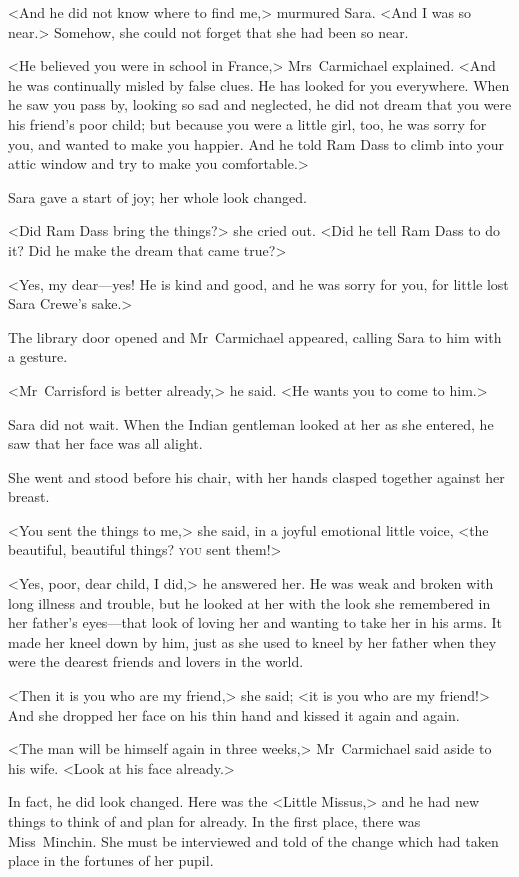 <And he did not know where to find me,> murmured Sara. <And I was so near.> Somehow, she could not forget that she had been so near.

<He believed you were in school in France,> Mrs~Carmichael explained. <And he was continually misled by false clues. He has looked for you everywhere. When he saw you pass by, looking so sad and neglected, he did not dream that you were his friend's poor child; but because you were a little girl, too, he was sorry for you, and wanted to make you happier. And he told Ram Dass to climb into your attic window and try to make you comfortable.>

Sara gave a start of joy; her whole look changed.

<Did Ram Dass bring the things?> she cried out. <Did he tell Ram Dass to do it? Did he make the dream that came true?>

<Yes, my dear—yes! He is kind and good, and he was sorry for you, for little lost Sara Crewe's sake.>

The library door opened and Mr~Carmichael appeared, calling Sara to him with a gesture.

<Mr~Carrisford is better already,> he said. <He wants you to come to him.>

Sara did not wait. When the Indian gentleman looked at her as she entered, he saw that her face was all alight.

She went and stood before his chair, with her hands clasped together against her breast.

<You sent the things to me,> she said, in a joyful emotional little voice, <the beautiful, beautiful things? \textsc{you} sent them!>

<Yes, poor, dear child, I did,> he answered her. He was weak and broken with long illness and trouble, but he looked at her with the look she remembered in her father's eyes—that look of loving her and wanting to take her in his arms. It made her kneel down by him, just as she used to kneel by her father when they were the dearest friends and lovers in the world.

<Then it is you who are my friend,> she said; <it is you who are my friend!> And she dropped her face on his thin hand and kissed it again and again.

<The man will be himself again in three weeks,> Mr~Carmichael said aside to his wife. <Look at his face already.>

In fact, he did look changed. Here was the <Little Missus,> and he had new things to think of and plan for already. In the first place, there was Miss~Minchin. She must be interviewed and told of the change which had taken place in the fortunes of her pupil.

